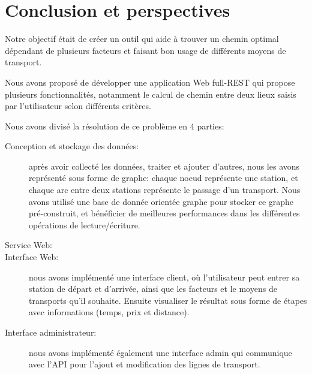 \chapter{Conclusion et perspectives}

Notre objectif était de créer un outil qui aide à trouver un chemin optimal dépendant de plusieurs facteurs et faisant bon usage de différents moyens de transport. 

Nous avons proposé  de développer une application Web full-REST qui propose plusieurs fonctionnalités, notamment le calcul de chemin entre deux lieux saisis par l'utilisateur selon différents critères.


Nous avons divisé la résolution de ce problème en 4 parties:

\begin{description}
\item[Conception et stockage des données:] après avoir collecté les données, traiter et ajouter d'autres, nous les avons représenté sous forme de graphe: chaque noeud représente une station, et chaque arc entre deux stations représente le passage d'un transport.\newline
Nous avons utilisé une base de donnée orientée graphe pour stocker ce graphe pré-construit, et bénéficier de meilleures performances dans les différentes opérations de lecture/écriture.
\item[Service Web:] 
\item[Interface Web:]  nous avons implémenté une interface client, où l'utilisateur peut entrer sa station de départ et d'arrivée, ainsi que les facteurs et le moyens de transports qu'il souhaite.
Ensuite visualiser le résultat sous forme de étapes avec informations (temps, prix et distance).

\item[Interface administrateur:] nous avons implémenté également une interface admin qui communique avec l'API pour l'ajout et modification des lignes de transport.

\end{description}


